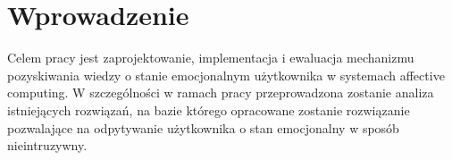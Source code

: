 \chapter{Wprowadzenie}
\label{cha:wprowadzenie}

Celem pracy jest zaprojektowanie, implementacja i ewaluacja mechanizmu pozyskiwania wiedzy o stanie emocjonalnym użytkownika w systemach affective computing. W szczególności w ramach pracy przeprowadzona zostanie analiza istniejących rozwiązań, na bazie którego opracowane zostanie rozwiązanie pozwalające na odpytywanie użytkownika o stan emocjonalny w sposób nieintruzywny.
